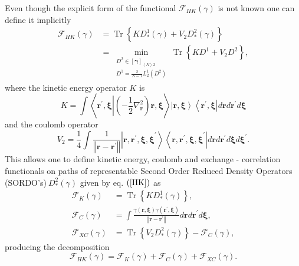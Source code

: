 \documentclass[aps,preprint]{revtex4}%
\begin{document}
Even though the explicit form of the functional $\mathcal{F}_{HK}\left(
\gamma\right)  $ is not known one can define it implicitly \cite{LevyLieb}
\begin{align*}
\mathcal{F}_{HK}\left(  \gamma\right)   &  =\operatorname{Tr}\left\{
\overset{}{KD_{\ast}^{1}\left(  \gamma\right)  +V_{2}D_{\ast}^{2}\left(
\gamma\right)  }\right\} \\
&  =\min_{\substack{D^{2}\in\left[  \mathbf{\gamma}\right]  _{\left\langle
N\right\rangle 2}\\D^{1}=\frac{2}{N-1}L_{2}^{1}\left(  D^{2}\right)
}}\operatorname{Tr}\left\{  \overset{}{KD^{1}+V_{2}D^{2}}\right\}  ,
\end{align*}
where the kinetic energy operator $K$ is
\begin{equation}
K=\int\left\langle \mathbf{r}^{\prime}\mathbf{,\xi}\left\vert \left(
-\frac{1}{2}\nabla_{\mathbf{r}}^{2}\right)  \mathbf{r,\xi}\right.
\right\rangle \left\vert \mathbf{r,\xi}\right\rangle \left\langle
\mathbf{r}^{\prime}\mathbf{,\xi}\right\vert d\mathbf{r}d\mathbf{r}^{\prime
}d\mathbf{\xi}%
\end{equation}
and the coulomb operator
\begin{equation}
V_{2}=\frac{1}{4}\int\frac{1}{\left\Vert \mathbf{r-r}^{\prime}\right\Vert
}\left\vert \mathbf{r,\mathbf{r}^{\prime},\xi,\xi}^{\prime}\right\rangle
\left\langle \mathbf{r,\mathbf{r}^{\prime},\xi,\xi}^{\prime}\right\vert
d\mathbf{r}d\mathbf{r}^{\prime}d\mathbf{\xi}d\mathbf{\xi}^{\prime}.
\end{equation}
This allows one to define kinetic energy, coulomb and exchange - correlation
functionals on paths of representable \cite{Kummer2} Second Order Reduced
Density Operators (SORDO's)$\ D_{\ast}^{2}\left(  \gamma\right)  $ given by
eq. $\left(  \ref{HK}\right)  $ as
\begin{align*}
\mathcal{F}_{K}\left(  \gamma\right)   &  =\operatorname{Tr}\left\{  KD_{\ast
}^{1}\left(  \gamma\right)  \right\}  ,\\
\mathcal{F}_{C}\left(  \gamma\right)   &  =\int\frac{\gamma\left(
\mathbf{r,\xi}\right)  \gamma\left(  \mathbf{r}^{\prime}\mathbf{,\xi}\right)
}{\left\Vert \mathbf{r-r}^{\prime}\right\Vert }d\mathbf{r}d\mathbf{r}^{\prime
}d\mathbf{\xi},\\
\mathcal{F}_{XC}\left(  \gamma\right)   &  =\operatorname{Tr}\left\{
V_{2}D_{\ast}^{2}\left(  \gamma\right)  \right\}  -\mathcal{F}_{C}\left(
\gamma\right)  ,
\end{align*}
producing the decomposition
\[
\mathcal{F}_{HK}\left(  \gamma\right)  =\mathcal{F}_{K}\left(  \gamma\right)
+\mathcal{F}_{C}\left(  \gamma\right)  +\mathcal{F}_{XC}\left(  \gamma\right)
.
\]
\end{document}
